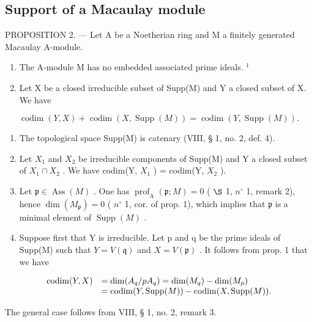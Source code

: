 \subsection{Support of a Macaulay module}

PROPOSITION 2. — Let A be a Noetherian ring and M a finitely generated Macaulay A-module.

\begin{enumerate}
\def\labelenumi{\alph{enumi})}
\item
  The A-module M has no embedded associated prime ideals. \(^{1}\)
\item
  Let X be a closed irreducible subset of Supp(M) and Y a closed subset of X. We have
\end{enumerate}

\[
\operatorname{codim} (Y, X) + \operatorname{codim} (X, \operatorname{Supp} (M)) = \operatorname{codim} (Y, \operatorname{Supp} (M)).
\]

\begin{enumerate}
\def\labelenumi{\alph{enumi})}
\setcounter{enumi}{2}
\item
  The topological space Supp(M) is catenary (VIII, § 1, no. 2, def. 4).
\item
  Let \(X_{1}\) and \(X_{2}\) be irreducible components of Supp(M) and Y a closed subset of \(X_{1} \cap X_{2}\) . We have codim(Y, \(X_{1}\) ) = codim(Y, \(X_{2}\) ).
\item
  Let \(\mathfrak{p} \in \operatorname{Ass}(M)\) . One has \(\operatorname{prof}_{\mathrm{A}}(\mathfrak{p}; M) = 0\) ( \(\S\) 1, \(n^{\circ}\) 1, remark 2), hence \(\dim(M_{\mathfrak{p}}) = 0\) ( \(n^{\circ}\) 1, cor. of prop. 1), which implies that \(\mathfrak{p}\) is a minimal element of \(\operatorname{Supp}(M)\) .
\item
  Suppose first that Y is irreducible. Let p and q be the prime ideals of Supp(M) such that \(Y = V(\mathfrak{q})\) and \(X = V(\mathfrak{p})\) . It follows from prop. 1 that we have
\end{enumerate}

\[
\begin{array}{r l} \operatorname{codim} (Y, X) & = \dim (A _ {q} / p A _ {q}) = \dim (M _ {q}) - \dim (M _ {p}) \\ & = \operatorname{codim} (Y, \operatorname{Supp} (M)) - \operatorname{codim} (X, \operatorname{Supp} (M)). \end{array}
\]

The general case follows from VIII, § 1, no. 2, remark 3.

